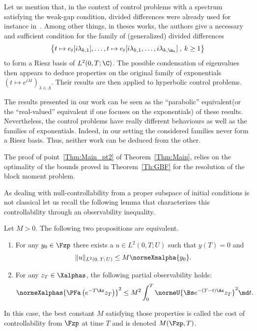 Let us mention that, in the context of control problems with a spectrum satisfying the weak-gap condition, divided differences were already used for instance in~\cite{AvdoninIvanov01,BaiocchiKomornikLoreti:2002}. Among other things, in theses works, the authors give a necessary and sufficient condition for the family of (generalized) divided differences
\[
\big\{ t \mapsto e_t[i \lambda_{k,1}], \dotsc, t \mapsto e_t[i \lambda_{k,1}, \dotsc, i \lambda_{k, \n_k}] \:, \: k \geq 1 \big\}
\]
to form a Riesz basis of $L^2(0,T ; \C)$. The possible condensation of eigenvalues then appears to deduce properties on the original family of exponentials $(t\mapsto e^{i \lambda t})_{\lambda \in \Lambda}$. Their results are then applied to hyperbolic control problems.

The results presented in our work can be seen as the ``parabolic'' equivalent\linebreak(or the ``real-valued'' equivalent if one focuses on the exponentials) of these results. Nevertheless, the control problems have really different behaviours as well as the families of exponentials. Indeed, in our setting the considered families never form a Riesz basis. Thus, neither work can be deduced from the other.

The proof of point~\eqref{Thm:Main_pt2} of Theorem~\ref{Thm:Main}, relies on the optimality of the bounds proved in Theorem~\ref{Th:GBF} for the resolution of the block moment problem.

As dealing with null-controllability from a proper subspace of initial conditions is not classical let us recall the following lemma that characterizes this controllability through an observability inequality.

\begin{lemm}\label{Lemmme:Observabilite}
Let $M>0$.
The following two propositions are equivalent.
\begin{enumerate}
\item \label{1.13.1} For any $y_0 \in \Fzp$ there exists a $u \in L^2(0,T;U)$ such that $y(T) = 0$ and
\begin{equation*}
\| u \|_{L^2(0,\,T ;\,U)} \leq M \normeXmalpha{ y_0 }.
\end{equation*}
\item \label{1.13.2}For any $z_T \in \Xalphas$, the following partial observability holds:
\begin{equation}\label{InegObs}
\normeXalphas{ \PFa \left(e^{-T \As} z_T \right) }^2 \leq M^2 \int_0^T \normeU{ \Bs e^{-(T-t) \As} z_T }^2 \md t.
\end{equation}
\end{enumerate}
In this case, the best constant $M$ satisfying those properties is called the cost of controllability from $\Fzp$ at time $T$ and is denoted $M(\Fzp,T)$.
\end{lemm}



